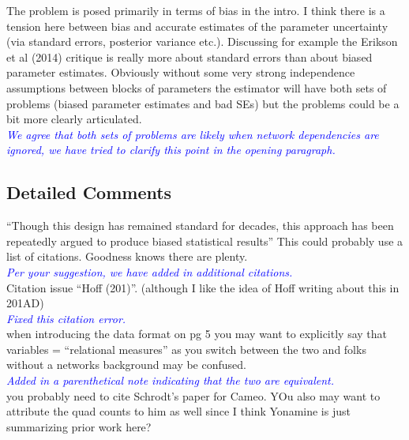 The problem is posed primarily in terms of bias in the intro. I think there is a tension here between bias and accurate estimates of the parameter uncertainty (via standard errors, posterior variance etc.). Discussing for example the Erikson et al (2014) critique is really more about standard errors than about biased parameter estimates. Obviously without some very strong independence assumptions between blocks of parameters the estimator will have both sets of problems (biased parameter estimates and bad SEs) but the problems could be a bit more clearly articulated. \\

\textcolor{blue}{\emph{
	We agree that both sets of problems are likely when network dependencies are ignored, we have tried to clarify this point in the opening paragraph.
}} \\

\subsection{Detailed Comments}

``Though this design has remained standard for decades, this approach has been repeatedly argued to produce biased statistical results'' This could probably use a list of citations. Goodness knows there are plenty. \\

\textcolor{blue}{\emph{
	Per your suggestion, we have added in additional citations. 
}} \\

Citation issue ``Hoff (201)''. (although I like the idea of Hoff writing about this in 201AD) \\

\textcolor{blue}{\emph{
	Fixed this citation error.
}} \\

when introducing the data format on pg 5 you may want to explicitly say that variables = ``relational measures'' as you switch between the two and folks without a networks background may be confused. \\

\textcolor{blue}{\emph{
	Added in a parenthetical note indicating that the two are equivalent.
}} \\

you probably need to cite Schrodt's paper for Cameo. YOu also may want to attribute the quad counts to him as well since I think Yonamine is just summarizing prior work here? \\

